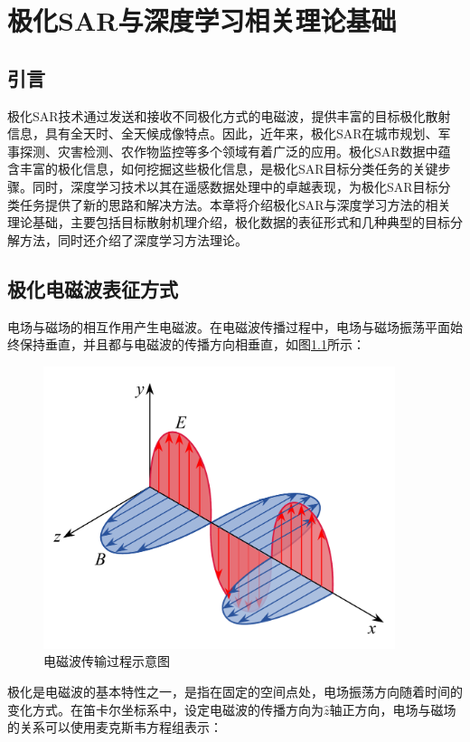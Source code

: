 \chapter{极化SAR与深度学习相关理论基础}
\section{引言}
极化SAR技术通过发送和接收不同极化方式的电磁波，提供丰富的目标极化散射信息，具有全天时、全天候成像特点。因此，近年来，极化SAR在城市规划、军事探测、灾害检测、农作物监控等多个领域有着广泛的应用。极化SAR数据中蕴含丰富的极化信息，如何挖掘这些极化信息，是极化SAR目标分类任务的关键步骤。同时，深度学习技术以其在遥感数据处理中的卓越表现，为极化SAR目标分类任务提供了新的思路和解决方法。本章将介绍极化SAR与深度学习方法的相关理论基础，主要包括目标散射机理介绍，极化数据的表征形式和几种典型的目标分解方法，同时还介绍了深度学习方法理论。

\section{极化电磁波表征方式}
电场与磁场的相互作用产生电磁波。在电磁波传播过程中，电场与磁场振荡平面始终保持垂直，并且都与电磁波的传播方向相垂直，如图\ref{电磁波传输过程示意图}所示：

\begin{figure}[h]
    \includegraphics[width=10.3cm]{pic/chapter2/电磁波传输过程.pdf}
    \caption{电磁波传输过程示意图}
    \label{电磁波传输过程示意图}
\end{figure}

极化是电磁波的基本特性之一，是指在固定的空间点处，电场振荡方向随着时间的变化方式。在笛卡尔坐标系中，设定电磁波的传播方向为$\hat{z}$轴正方向，电场与磁场的关系可以使用麦克斯韦方程组表示：

